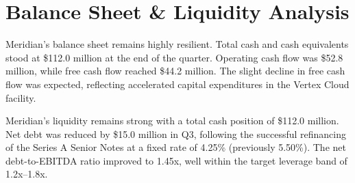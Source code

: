 \section{Balance Sheet \& Liquidity Analysis}
Meridian's balance sheet remains highly resilient. Total cash and cash equivalents stood at \$112.0 million at the end of the quarter. Operating cash flow was \$52.8 million, while free cash flow reached \$44.2 million. The slight decline in free cash flow was expected, reflecting accelerated capital expenditures in the Vertex Cloud facility.

\begin{tcolorbox}[
  colback=LightBG,
  colframe=AccentTeal,
  arc=1mm,
  boxrule=1.5pt,
  title={\sffamily\small\bfseries Liquidity Profile \& Debt Management},
  coltitle=white,
  colbacktitle=AccentTeal,
  left=8pt,
  right=8pt,
  top=8pt,
  bottom=8pt
]
  {\sffamily\small
  Meridian's liquidity remains strong with a total cash position of \$112.0 million. Net debt was reduced by \$15.0 million in Q3, following the successful refinancing of the Series A Senior Notes at a fixed rate of 4.25\% (previously 5.50\%). The net debt-to-EBITDA ratio improved to 1.45x, well within the target leverage band of 1.2x--1.8x.
  }
\end{tcolorbox}
